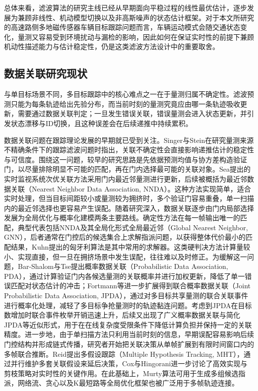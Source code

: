 \documentclass{xdupgthesis}
\begin{document}
总体来看，滤波算法的研究主线已经从早期面向平稳过程的线性最优估计，逐步发展为兼顾非线性、机动模型切换以及非高斯噪声的状态估计框架。对于本文所研究的高速路侧多地磁传感器车辆目标跟踪问题而言，车辆运动模式会随交通状态变化，量测又容易受到环境扰动与漏检的影响，因此如何在保证实时性的前提下兼顾机动性描述能力与估计稳定性，仍是这类滤波方法设计中的重要取舍。

\subsection{数据关联研究现状}
与单目标场景不同，多目标跟踪中的核心难点之一在于量测归属不确定性。滤波预测只能为每条轨迹给出先验分布，而当前时刻的量测究竟应由哪一条轨迹吸收更新，需要通过数据关联判定；一旦发生错误关联，错误量测会进入状态更新，并引发状态漂移与ID切换，且这种误差会在后续递推中持续累积\cite{barshalomli1995multitarget}。

数据关联问题在跟踪理论发展的早期就已受到关注。Singer与Stein在研究量测来源不精确条件下的跟踪滤波问题时指出，关联不确定性会直接影响递推估计的稳定性与可信度\cite{singer1971optimaltracking}。围绕这一问题，较早的研究思路是先依据预测均值与协方差构造验证门，以尽量排除明显不可能的匹配，再在门内选择最可能的关联对象。Sea提出的实时监视系统次优关联方法采用门内最近邻量测进行更新，后续被概括为最近邻数据关联（Nearest Neighbor Data Association, NNDA）\cite{sea1971suboptimal}。这种方法实现简单，适合实时处理，但当目标间距较小或量测较为拥挤时，多个验证门容易重叠，单一扫描内的最近邻选择也更容易产生误配。随着研究深入，数据关联逐步由门内局部选择发展为全局优化与概率化建模两条主要路线。确定性方法在每一帧输出唯一的匹配，典型代表包括NNDA及其全局化形式全局最近邻（Global Nearest Neighbor, GNN），后者通常在门控后的候选集合上求解指派问题，以获得整体代价最小的匹配结果，Kuhn提出的匈牙利算法是其中常用的求解器\cite{kuhn1955hungarian}。这类硬判决方法计算量较小、实现直接，但一旦在拥挤场景中发生误配，往往难以及时修正。为缓解这一问题，Bar-Shalom与Tse提出概率数据关联（Probabilistic Data Association, PDA），通过计算验证门内各候选量测的关联概率并进行加权更新，降低了单一错误匹配对状态估计的冲击\cite{barshalom1975pda}；Fortmann等进一步扩展得到联合概率数据关联（Joint Probabilistic Data Association, JPDA），通过对多目标共享量测的联合关联事件进行概率化处理，减轻了多目标争抢量测时的轨迹黏连问题\cite{fortmann1983jpda}。考虑到JPDA在目标数增加时联合事件枚举开销迅速上升，后续又出现了广义概率数据关联与简化JPDA等近似形式，用于在在线复杂度受限条件下降低计算负担并保持一定的关联精度\cite{pan2005gpda,qin2005simplifiedjpda,sheng2020simplifiedjpda}。进一步地，由于单扫描方法只利用当前时刻的信息，早期误配容易影响后续门控结构并形成链式传播，研究者开始把关联决策从单帧扩展到有限时间窗口内的多帧联合推断。Reid提出多假设跟踪（Multiple Hypothesis Tracking, MHT），通过并行维护多套关联假设来延后决策\cite{reid1979mht}，Cox与Hingorani进一步讨论了高效实现与剪枝策略对实时性的关键作用\cite{cox1996efficientmht}。在此基础上，Murty算法可用于生成多组候选指派\cite{murty1968ranking}，网络流、贪心以及K最短路等全局优化框架也被广泛用于多帧轨迹连接\cite{zhang2008networkflow,pirsiavash2011greedy,berclaz2011kshortest}。
\end{document}
